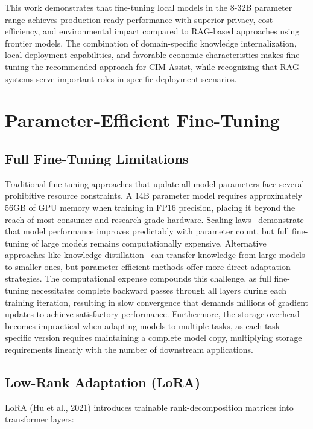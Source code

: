 This work demonstrates that fine-tuning local models in the 8-32B parameter range achieves production-ready performance with superior privacy, cost efficiency, and environmental impact compared to RAG-based approaches using frontier models. The combination of domain-specific knowledge internalization, local deployment capabilities, and favorable economic characteristics makes fine-tuning the recommended approach for CIM Assist, while recognizing that RAG systems serve important roles in specific deployment scenarios.



\section{Parameter-Efficient Fine-Tuning}

\subsection{Full Fine-Tuning Limitations}

Traditional fine-tuning approaches that update all model parameters face several prohibitive resource constraints. A 14B parameter model requires approximately 56GB of GPU memory when training in FP16 precision, placing it beyond the reach of most consumer and research-grade hardware. Scaling laws~\cite{kaplan2020scaling} demonstrate that model performance improves predictably with parameter count, but full fine-tuning of large models remains computationally expensive. Alternative approaches like knowledge distillation~\cite{hinton2015distilling} can transfer knowledge from large models to smaller ones, but parameter-efficient methods offer more direct adaptation strategies. The computational expense compounds this challenge, as full fine-tuning necessitates complete backward passes through all layers during each training iteration, resulting in slow convergence that demands millions of gradient updates to achieve satisfactory performance. Furthermore, the storage overhead becomes impractical when adapting models to multiple tasks, as each task-specific version requires maintaining a complete model copy, multiplying storage requirements linearly with the number of downstream applications.

\subsection{Low-Rank Adaptation (LoRA)}

LoRA (Hu et al., 2021) introduces trainable rank-decomposition matrices into transformer layers:

